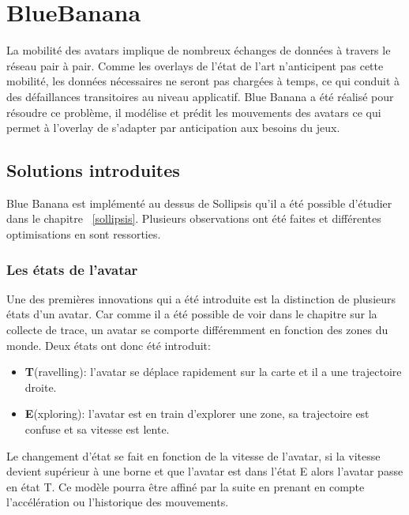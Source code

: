 \section{BlueBanana}
	\label{Blue Banana}
	La mobilité des avatars implique de nombreux échanges de données à travers le réseau pair à pair. Comme les overlays de l'état de l'art n'anticipent pas cette mobilité, les données nécessaires ne seront pas chargées à temps, ce qui conduit à des défaillances transitoires au niveau applicatif. Blue Banana a été réalisé pour résoudre ce problème, il modélise et prédit les mouvements des avatars ce qui permet à l'overlay de s'adapter par anticipation aux besoins du jeux.
	\subsection{Solutions introduites}
	Blue Banana est implémenté au dessus de Sollipsis qu'il a été possible d'étudier dans le chapitre ~\ref{sollipsis}. Plusieurs observations ont été faites et différentes optimisations en sont ressorties.
	\subsubsection{Les états de l'avatar}
	Une des premières innovations qui a été introduite est la distinction de plusieurs états d'un avatar. Car comme il a été possible de voir dans le chapitre sur la collecte de trace, un avatar se comporte différemment en fonction des zones du monde. Deux états ont donc été introduit:
	\begin{itemize}
	\renewcommand{\labelitemi}{$\bullet$}
		\item \textbf{T}(ravelling): l'avatar se déplace rapidement sur la carte et il a une trajectoire droite.  
		\item \textbf{E}(xploring): l'avatar est en train d'explorer une zone, sa trajectoire est confuse et sa vitesse est lente.
	\end{itemize} 
	Le changement d'état se fait en fonction de la vitesse de l'avatar, si la vitesse devient supérieur à une borne et que l'avatar est dans l'état E alors l'avatar passe en état T. Ce modèle pourra être affiné par la suite en prenant en compte l'accélération ou l'historique des mouvements. \\
